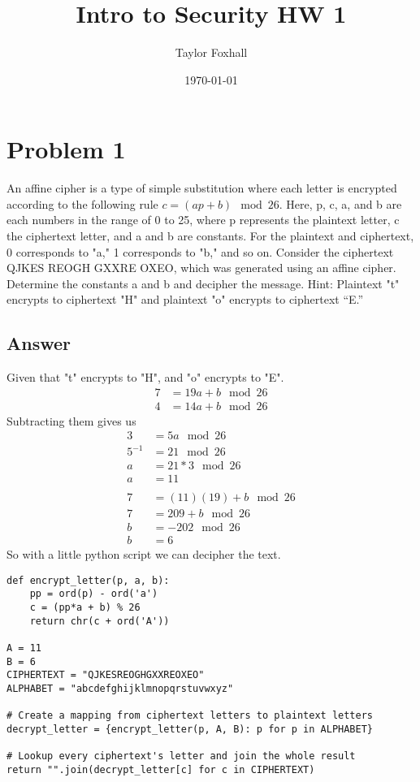 \documentclass[11pt]{article}
\author{Taylor Foxhall}
\date{\today}
\title{Intro to Security HW 1}
\begin{document}
\maketitle
\section{Problem 1}
\label{sec-1}
An affine cipher is a type of simple substitution where each letter
is encrypted according to the following rule $c = (a p + b)
  \mod 26$. Here, p, c, a, and b are each numbers in the range of 0 to
25, where p represents the plaintext letter, c the ciphertext
letter, and a and b are constants. For the plaintext and ciphertext,
0 corresponds to "a," 1 corresponds to "b," and so on. Consider the
ciphertext QJKES REOGH GXXRE OXEO, which was generated using an
affine cipher. Determine the constants a and b and decipher the
message. Hint: Plaintext "t" encrypts to ciphertext "H" and
plaintext "o" encrypts to ciphertext “E.”
\subsection{Answer}
\label{sec-1-1}
Given that "t" encrypts to "H", and "o" encrypts to "E".
\begin{align*}
7 &= 19a + b \mod 26 \\
4 &= 14a + b \mod 26
\end{align*}
Subtracting them gives us
\begin{align*}
3 &= 5a \mod 26 \\
5^{-1} &= 21 \mod 26 \\
a &= 21*3 \mod 26 \\
a &= 11 \\
\\
7 &= (11)(19) + b \mod 26 \\
7 &= 209 + b \mod 26 \\
b &= -202 \mod 26 \\
b &= 6
\end{align*}
So with a little python script we can decipher the text.
\begin{verbatim}
def encrypt_letter(p, a, b):
    pp = ord(p) - ord('a')
    c = (pp*a + b) % 26
    return chr(c + ord('A'))

A = 11
B = 6
CIPHERTEXT = "QJKESREOGHGXXREOXEO"
ALPHABET = "abcdefghijklmnopqrstuvwxyz"

# Create a mapping from ciphertext letters to plaintext letters
decrypt_letter = {encrypt_letter(p, A, B): p for p in ALPHABET}

# Lookup every ciphertext's letter and join the whole result
return "".join(decrypt_letter[c] for c in CIPHERTEXT)
\end{verbatim}
\end{document}
